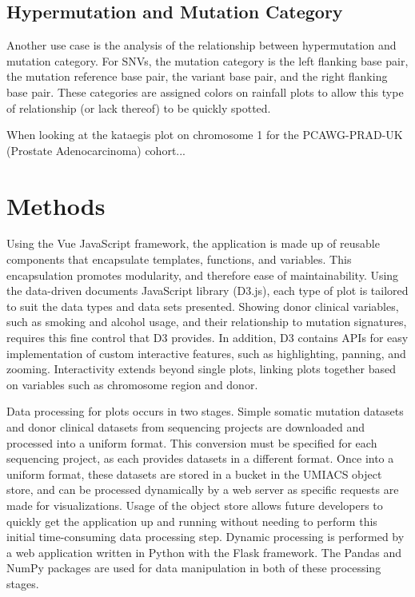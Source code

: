 \documentclass[12pt, letterpaper]{article}
\begin{document}
\subsection{Hypermutation and Mutation Category}
Another use case is the analysis of the relationship between hypermutation and mutation category.
For SNVs, the mutation category is the left flanking base pair, the mutation reference base pair, the variant base pair, and the right flanking base pair.
These categories are assigned colors on rainfall plots to allow this type of relationship (or lack thereof) to be quickly spotted.

When looking at the kataegis plot on chromosome 1 for the PCAWG-PRAD-UK (Prostate Adenocarcinoma) cohort...



\section{Methods}
Using the Vue JavaScript framework, the application is made up of reusable components that encapsulate templates, functions, and variables.
This encapsulation promotes modularity, and therefore ease of maintainability.
Using the data-driven documents JavaScript library (D3.js)\cite{bostock2011d3}, each type of plot is tailored to suit the data types and data sets presented.
Showing donor clinical variables, such as smoking and alcohol usage, and their relationship to mutation signatures, requires this fine control that D3 provides.
In addition, D3 contains APIs for easy implementation of custom interactive features, such as highlighting, panning, and zooming.
Interactivity extends beyond single plots, linking plots together based on variables such as chromosome region and donor.

Data processing for plots occurs in two stages. 
Simple somatic mutation datasets and donor clinical datasets from sequencing projects are downloaded and processed into a uniform format. 
This conversion must be specified for each sequencing project, as each provides datasets in a different format.
Once into a uniform format, these datasets are stored in a bucket in the UMIACS object store, and can be processed dynamically by a web server as specific requests are made for visualizations.
Usage of the object store allows future developers to quickly get the application up and running without needing to perform this initial time-consuming data processing step.
Dynamic processing is performed by a web application written in Python with the Flask framework. 
The Pandas and NumPy packages are used for data manipulation in both of these processing stages.
\end{document}
